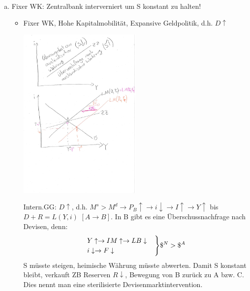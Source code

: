 \documentclass{scrartcl}
\newenvironment{rcases}{%
  \left.\renewcommand*\lbrace.%
  \begin{cases}}%
{\end{cases}\right\rbrace}
\begin{document}
\begin{enumerate}[a)]
\begin{itemize}
  \end{itemize}
  \item Fixer WK: Zentralbank interverniert um S konstant zu halten!

  \begin{itemize}
  \item Fixer WK, Hohe Kapitalmobilit\"{a}t, Expansive Geldpolitik, d.h. $D\uparrow$
\begin{center}
  \includegraphics[width=0.5\textwidth]{Bilder/MF1.pdf}
\end{center}
  Intern.GG: $D\uparrow$, d.h. $M^s>M^d \rightarrow P_B \uparrow \rightarrow i \downarrow \rightarrow I \uparrow \rightarrow Y \uparrow$ bis $D+R = L(Y,i)$ $[A\rightarrow B ]$.
  In B gibt es eine \"{U}berschussnachfrage nach Devisen, denn:
  \begin{align*}
    \begin{rcases}
    Y \uparrow \rightarrow IM \uparrow \rightarrow LB \downarrow\\
    i \downarrow \rightarrow F\downarrow
    \end{rcases}
    \$^{N}>\$^{A}
  \end{align*}
  S m\"{u}sste steigen, heimische W\"{a}hrung m\"{u}sste abwerten. Damit S konstant bleibt, verkauft ZB Reserven $R\downarrow$, Bewegung von B zur\"{u}ck zu A bzw. C. Dies nennt man eine sterilisierte Devisenmarktintervention.


\end{itemize}
\end{enumerate}
\end{document}
